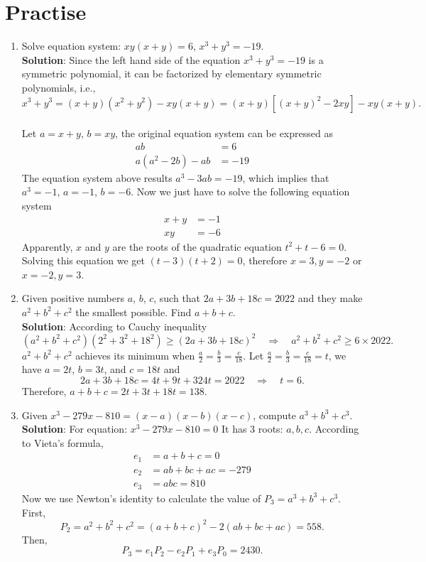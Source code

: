 \documentclass[11pt, oneside]{article}   	%
\begin{document}
\section{Practise}
\begin{enumerate}
\item
Solve equation system: $xy(x+y)=6$, $x^3+y^3=-19$.\\
\textbf{Solution}: 
Since the left hand side of the equation $x^3+y^3=-19$ is a symmetric polynomial, it can be factorized by elementary symmetric polynomials, i.e.,
\[x^3+y^3 =  (x+y)(x^2+y^2)-xy(x+y) = (x+y)[(x+y)^2-2xy]-xy(x+y).\] \\
Let $a=x+y$, $b=xy$, the original equation system can be expressed as 
\begin{align*}
ab &= 6\\
a(a^2-2b)-ab&=-19
\end{align*}
The equation system above results $a^3-3ab=-19$, which implies that $a^3=-1$, $a=-1$, $b=-6$.
Now we just have to solve the following equation system
\begin{align*}
x+y&=-1\\
xy&=-6
\end{align*}
Apparently, $x$ and $y$ are the roots of the quadratic equation $t^2+t-6=0$. Solving this equation we get $(t-3)(t+2)=0$, therefore $x=3, y=-2$ or $x=-2, y=3$.


\item
Given positive numbers $a$, $b$, $c$, such that $2a+3b+18c=2022$ and they make $a^2+b^2+c^2$ the smallest possible. Find $a+b+c$.\\
\textbf{Solution}: 
According to Cauchy inequality 
\[(a^2+b^2+c^2)(2^2+3^2+18^2)\ge(2a+3b+18c)^2  \quad \Rightarrow \quad a^2+b^2+c^2 \ge 6 \times 2022.\]
$a^2+b^2+c^2$ achieves its minimum when $\frac{a}{2}=\frac{b}{3}=\frac{c}{18}$.
Let $\frac{a}{2}=\frac{b}{3}=\frac{c}{18}=t$, we have $a=2t$, $b=3t$, and $c=18t$ and 
\[2a+3b+18c=4t+9t+324t=2022 \quad \Rightarrow \quad  t=6. \]
Therefore, $a+b+c=2t+3t+18t=138$.

\item
Given $x^3-279x-810=(x-a)(x-b)(x-c)$, compute $a^3+b^3+c^3$.\\
\textbf{Solution}: 
For equation: $x^3-279x-810=0$ It has 3 roots: $a, b, c$. According to Vieta's formula, 
\begin{align*}
e_1&=a+b+c = 0 \\
e_2&=ab+bc+ac = -279 \\
e_3&=abc= 810
\end{align*}
Now we use Newton's identity to calculate the value of $P_3= a^3+b^3+c^3$. First, \[ P_2 = a^2+b^2+c^2 = (a+b+c)^2-2(ab+bc+ac)= 558. \]
Then, \[ P_3=e_1 P_2 - e_2 P_1 + e_3 P_0 = 2430. \]


\end{enumerate}
\end{document}
